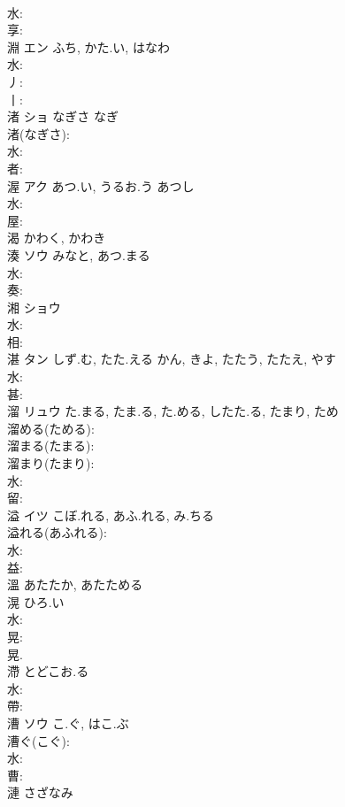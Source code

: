 \documentclass[8pt]{extreport}
\begin{document}
\begin{CJK}{UTF8}{min}
\\	水: 
\\	享: 
\\	淵	エン	ふち, かた.い, はなわ		
\\	水: 
\\	丿: 
\\	丨: 
\\	渚	ショ	なぎさ	なぎ	
\\	渚(なぎさ): 
\\	水: 
\\	者: 
\\	渥	アク	あつ.い, うるお.う	あつし	
\\	水: 
\\	屋: 
\\	渴		かわく, かわき				
\\	湊	ソウ	みなと, あつ.まる		
\\	水: 
\\	奏: 
\\	湘	ショウ			
\\	水: 
\\	相: 
\\	湛	タン	しず.む, たた.える	かん, きよ, たたう, たたえ, やす	
\\	水: 
\\	甚: 
\\	溜	リュウ	た.まる, たま.る, た.める, したた.る, たまり, ため		
\\	溜める(ためる): 
\\	溜まる(たまる): 
\\	溜まり(たまり): 
\\	水: 
\\	留: 
\\	溢	イツ	こぼ.れる, あふ.れる, み.ちる		
\\	溢れる(あふれる): 
\\	水: 
\\	益: 
\\	溫		あたたか, あたためる				
\\	滉		ひろ.い				
\\	水: 
\\	晃: 
\\	晃.
\\	滯		とどこお.る				
\\	水: 
\\	帶: 
\\	漕	ソウ	こ.ぐ, はこ.ぶ		
\\	漕ぐ(こぐ): 
\\	水: 
\\	曹: 
\\	漣		さざなみ				

\end{CJK}
\end{document}
